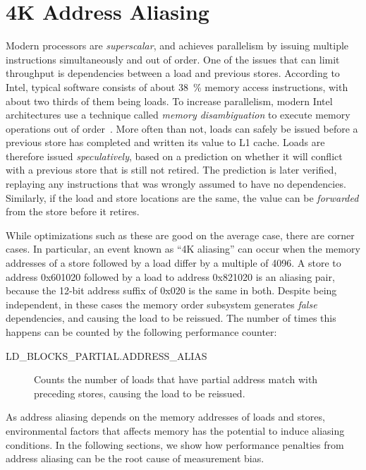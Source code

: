 \documentclass[prodmode,acmtaco]{acmsmall}
\begin{document}
\section{4K Address Aliasing}
Modern processors are \emph{superscalar}, and achieves parallelism by issuing multiple instructions simultaneously and out of order.
One of the issues that can limit throughput is dependencies between a load and previous stores.
According to Intel, typical software consists of about 38~\% memory access instructions, with about two thirds of them being loads.
To increase parallelism, modern Intel architectures use a technique called \emph{memory disambiguation} to execute memory operations out of order~\cite{Intel:2006:InsideICM:SmartMemoryAccess}. 
More often than not, loads can safely be issued before a previous store has completed and written its value to L1 cache.
Loads are therefore issued \emph{speculatively}, based on a prediction on whether it will conflict with a previous store that is still not retired.
The prediction is later verified, replaying any instructions that was wrongly assumed to have no dependencies.
Similarly, if the load and store locations are the same, the value can be \emph{forwarded} from the store before it retires.

While optimizations such as these are good on the average case, there are corner cases. 
In particular, an event known as ``4K aliasing'' can occur when the memory addresses of a store followed by a load differ by a multiple of 4096.
A store to address 0x601020 followed by a load to address 0x821020 is an aliasing pair, because the 12-bit address suffix of 0x020 is the same in both. 
Despite being independent, in these cases the memory order subsystem generates \emph{false} dependencies, and causing the load to be reissued.
The number of times this happens can be counted by the following performance counter:
\begin{description}
  \item[LD\_BLOCKS\_PARTIAL.ADDRESS\_ALIAS]
  Counts the number of loads that have partial address match with preceding stores, causing the load to be reissued.~\cite{OptimizationManual} %
\end{description}

As address aliasing depends on the memory addresses of loads and stores, environmental factors that affects memory has the potential to induce aliasing conditions.
In the following sections, we show how performance penalties from address aliasing can be the root cause of measurement bias.
\end{document}
